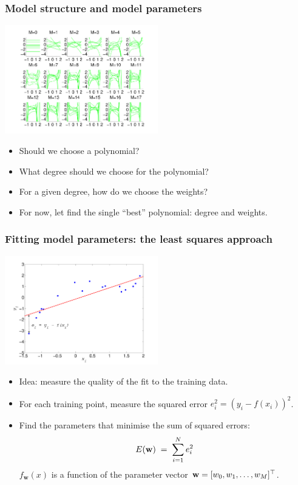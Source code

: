 \begin{frame}
\frametitle{Model structure and model parameters}

\centerline{\includegraphics[width=0.5\textwidth]{random_polynomials.pdf}}

\begin{itemize}
\item Should we choose a polynomial? \hfill{}
\item What degree should we choose for the polynomial? \hfill{}
\item For a given degree, how do we choose the weights? \hfill{}
\item For now, let find the single ``best'' polynomial: degree and weights.
\end{itemize}


\end{frame}
\begin{frame}
\frametitle{Fitting model parameters: the least squares approach}

\centerline{\includegraphics[width=0.5\textwidth]{toy_data_example_fit.pdf}}

\begin{itemize}
\item Idea: measure the quality of the fit to the training data.
\item For each training point, measure the squared error $e_i^2=(y_i-f(x_i))^2$.
\item Find the parameters that minimise the sum of squared errors:
%
\[
E(\mathbf w)\;=\;\sum_{i=1}^N e_i^2
\]
%
$f_{\bm w}(x)$ is a function of the parameter vector 
$\mathbf w=[w_0, w_1, \ldots, w_M]{\scriptsize^{\top}}$.
\end{itemize}


\end{frame}

